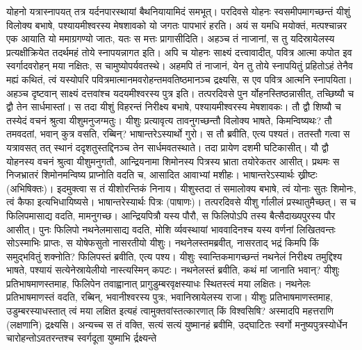 \vakya योहनो यत्रास्नापयत् तत्र यर्दनपारस्थायां बैथनियायामिदं समभूत्।
\vakya परदिवसे योहनः स्वसमीपमागच्छन्तं यीशुं विलोक्य बभाषे, पश्यायमीश्वरस्य मेषशावको यो जगतः पापभारं हरति।
\vakya अयं स यमधि मयोक्तं, मत्पश्चान्नर एक आयाति यो ममाग्रगण्यो जातः, यतः स मत्तः प्रागासीदिति।
\vakya अहञ्च तं नाजानां, स तु यदिस्रायेलस्य प्रत्यक्षीक्रियेत तदर्थमहं तोये स्नापयन्नागत इति।
\vakya अपि च योहनः साक्ष्यं दत्त्वावादीत्, पवित्र आत्मा कपोत इव स्वर्गादवरोहन् मया नक्षितः, स चामुष्योपर्यवतस्थे।
\vakya अहमपि तं नाजानं, येन तु तोये स्नापयितुं प्रहितोऽहं तेनैव मह्यं कथितं, त्वं यस्योपरि पवित्रमात्मानमवरोहन्तमवतिष्ठमानञ्च द्रक्ष्यसि, स एव पवित्र आत्मनि स्नापयिता।
\vakya अहञ्च दृष्टवान् साक्ष्यं दत्तवांश्च यदयमीश्वरस्य पुत्र इति।
\vakya तत्परदिवसे पुन र्योहनस्तिष्ठन्नासीत्, तच्छिष्यौ च द्वौ तेन सार्धमास्तां।
\vakya स तदा यीशुं विहरन्तं निरीक्ष्य बभाषे, पश्यायमीश्वरस्य मेषशावकः।
\vakya तौ द्वौ शिष्यौ च तस्येदं वचनं श्रुत्वा यीशुमनुजग्मतुः।
\vakya यीशुः प्रत्यावृत्य तावनुगच्छन्तौ विलोक्य भाषते, किमन्विष्यथः? तौ तमवदतां, भवान् कुत्र वसति, रब्बिन्? भाषान्तरेऽस्यार्थो गुरो।
\vakya स तौ ब्रवीति, एत्य पश्यतं। ततस्तौ गत्वा स यत्रावसत् तत् स्थानं ददृशतुस्तद्दिनञ्च तेन सार्धमवतस्थाते। तदा प्रायेण दशमी घटिकासीत्।
\vakya यौ द्वौ योहनस्य वचनं श्रुत्वा यीशुमनुगतौ, आन्द्रियनामा शिमोनस्य पित्रस्य भ्राता तयोरेकतर आसीत्।
\vakya प्रथमः स निजभ्रातरं शिमोनमन्विष्य प्राप्नोति वदति च, आसादित आवाभ्यां मशीहः। भाषान्तरेऽस्यार्थः ख्रीष्टः (अभिषिक्तः)।
\vakya इदमुक्त्वा स तं यीशोरन्तिकं निनाय। यीशुस्तदा तं समालोक्य बभाषे, त्वं योनाः सुतः शिमोनः, त्वं कैफा इत्यभिधायिष्यसे। भाषान्तरेस्यार्थः पित्रः (पाषाणः)।
\vakya तत्परदिवसे यीशु र्गालीलं प्रस्थातुमैच्छत्। स च फिलिपमासाद्य वदति, मामनुगच्छ।
\vakya आन्द्रियपित्रौ यस्य पौरौ, स फिलिपोऽपि तस्य बैत्सैदाख्यपुरस्य पौर आसीत्।
\vakya पुनः फिलिपो नथनेलमासाद्य वदति, मोशि र्व्यवस्थायां भाववादिनश्च यस्य वर्णनां लिखितवन्तः सोऽस्माभिः प्राप्तः, स योषेफसुतो नासरतीयो यीशुः।
\vakya नथनेलस्तमब्रवीत्, नासरताद् भद्रं किमपि किं समुद्भवितुं शक्नोति? फिलिपस्तं ब्रवीति, एत्य पश्य।
\vakya यीशुः स्वान्तिकमागच्छन्तं नथनेलं निरीक्ष्य तमुद्दिश्य भाषते, पश्यायं सत्येनेस्रायेलीयो नास्त्यस्मिन् कपटः।
\vakya नथनेलस्तं ब्रवीति, कथं मां जानाति भवान्? यीशुः प्रतिभाषमाणस्तमाह, फिलिपेन तवाह्वानात् प्रागुडुम्बरवृक्षस्याधः स्थितस्त्वं मया लक्षितः।
\vakya नथनेलः प्रतिभाषमाणस्तं वदति, रब्बिन्, भवानीश्वरस्य पुत्रः, भवानिस्रायेलस्य राजा।
\vakya यीशुः प्रतिभाषमाणस्तमाह, उडुम्बरस्याधस्तात् त्वं मया लक्षित इत्यहं त्वामुक्तवांस्तत्कारणात् किं विश्वसिषि? अस्मादपि महत्तराणि (लक्षणानि) द्रक्ष्यसि।
\vakya अन्यच्च स तं वक्ति, सत्यं सत्यं युष्मानहं ब्रवीमि, उद्घाटितः स्वर्गो मनुष्यपुत्रस्योर्धेन चारोहन्तोऽवतरन्तश्च स्वर्गदूता युष्माभि र्द्रक्ष्यन्ते\eoc